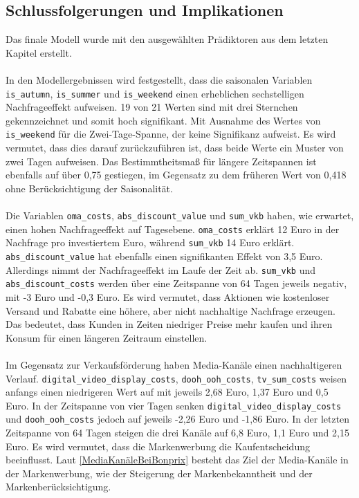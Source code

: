 \subsection{Schlussfolgerungen und Implikationen}
\label{schlussfolgerungenUndImplikationen}
Das finale Modell wurde mit den ausgewählten Prädiktoren aus dem letzten Kapitel erstellt. \\\\
In den Modellergebnissen wird festgestellt, dass die saisonalen Variablen \verb|is_autumn|, \verb|is_summer| und \verb|is_weekend| einen erheblichen sechstelligen Nachfrageeffekt aufweisen. 19 von 21 Werten sind mit drei Sternchen gekennzeichnet und somit hoch signifikant. Mit Ausnahme des Wertes von \verb|is_weekend| für die Zwei-Tage-Spanne, der keine Signifikanz aufweist. Es wird vermutet, dass dies darauf zurückzuführen ist, dass beide Werte ein Muster von zwei Tagen aufweisen. Das Bestimmtheitsmaß für längere Zeitspannen ist ebenfalls auf über 0,75 gestiegen, im Gegensatz zu dem früheren Wert von 0,418 ohne Berücksichtigung der Saisonalität.\\\\
Die Variablen \verb|oma_costs|, \verb|abs_discount_value| und \verb|sum_vkb| haben, wie erwartet, einen hohen Nachfrageeffekt auf Tagesebene. \verb|oma_costs| erklärt 12 Euro in der Nachfrage pro investiertem Euro, während \verb|sum_vkb| 14 Euro erklärt. \verb|abs_discount_value| hat ebenfalls einen signifikanten Effekt von 3,5 Euro. Allerdings nimmt der Nachfrageeffekt im Laufe der Zeit ab. \verb|sum_vkb| und \verb|abs_discount_costs| werden über eine Zeitspanne von 64 Tagen jeweils negativ, mit -3 Euro und -0,3 Euro. Es wird vermutet, dass Aktionen wie kostenloser Versand und Rabatte eine höhere, aber nicht nachhaltige Nachfrage erzeugen. Das bedeutet, dass Kunden in Zeiten niedriger Preise mehr kaufen und ihren Konsum für einen längeren Zeitraum einstellen. \\\\
Im Gegensatz zur Verkaufsförderung haben Media-Kanäle einen nachhaltigeren Verlauf. \verb|digital_video_display_costs|, \verb|dooh_ooh_costs|, \verb|tv_sum_costs| weisen anfangs einen niedrigeren Wert auf mit jeweils 2,68 Euro, 1,37 Euro und 0,5 Euro. In der Zeitspanne von vier Tagen senken \verb|digital_video_display_costs| und \verb|dooh_ooh_costs| jedoch auf jeweils -2,26 Euro und -1,86 Euro. In der letzten Zeitspanne von 64 Tagen steigen die drei Kanäle auf 6,8 Euro, 1,1 Euro und 2,15 Euro. Es wird vermutet, dass die Markenwerbung die Kaufentscheidung beeinflusst. Laut \autoref{MediaKanäleBeiBonprix} besteht das Ziel der Media-Kanäle in der Markenwerbung, wie der Steigerung der Markenbekanntheit und der Markenberücksichtigung.
